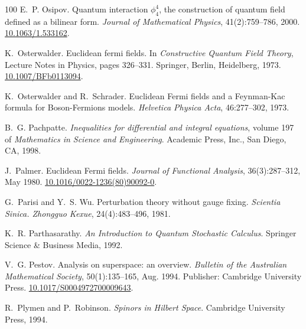 \documentclass[11pt]{article}
\newcommand{\tmtextit}[1]{{\itshape{#1}}}
\begin{document}
\begin{thebibliography}{100}
  E.~P. Osipov. {\newblock}Quantum
  interaction $\phi^4_4$, the construction of quantum field defined as a
  bilinear form. {\newblock}\tmtextit{Journal of Mathematical Physics},
  41(2):759--786, 2000.
  {\newblock}\href{https://doi.org/10.1063/1.533162}{10.1063/1.533162}.
  
  K.~Osterwalder.
  {\newblock}Euclidean fermi fields. {\newblock}In \tmtextit{Constructive
  Quantum Field Theory}, Lecture Notes in Physics, pages 326--331. Springer,
  Berlin, Heidelberg, 1973.
  {\newblock}\href{https://doi.org/10.1007/BFb0113094}{10.1007/BFb0113094}.
  
  K.~Osterwalder and R.~Schrader.
  {\newblock}Euclidean Fermi fields and a Feynman-Kac formula for
  Boson-Fermions models. {\newblock}\tmtextit{Helvetica Physica Acta},
  46:277--302, 1973.
  
  B.~G. Pachpatte.
  {\newblock}\tmtextit{Inequalities for differential and integral equations},
  volume 197 of \tmtextit{Mathematics in Science and Engineering}.
  {\newblock}Academic Press, Inc., San Diego, CA, 1998.
  
  J.~Palmer. {\newblock}Euclidean Fermi
  fields. {\newblock}\tmtextit{Journal of Functional Analysis},
  36(3):287--312, May 1980. {\newblock}
  \href{https://doi.org/10.1016/0022-1236(80)90092-0}{10.1016/0022-1236(80)90092-0}.
  
  G.~Parisi and Y.~S. Wu.
  {\newblock}Perturbation theory without gauge fixing.
  {\newblock}\tmtextit{Scientia Sinica. Zhongguo Kexue}, 24(4):483--496, 1981.
  
  K.~R. Parthasarathy.
  {\newblock}\tmtextit{An Introduction to Quantum Stochastic Calculus}.
  {\newblock}Springer Science \& Business Media, 1992.
  
  V.~G. Pestov. {\newblock}Analysis on
  superspace: an overview. {\newblock}\tmtextit{Bulletin of the Australian
  Mathematical Society}, 50(1):135--165, Aug. 1994. {\newblock}Publisher:
  Cambridge University Press.
  \href{https://doi.org/10.1017/S0004972700009643}{10.1017/S0004972700009643}.
  
  R.~Plymen and P.~Robinson.
  {\newblock}\tmtextit{Spinors in Hilbert Space}. {\newblock}Cambridge
  University Press, 1994.
  

\end{thebibliography}
\end{document}
